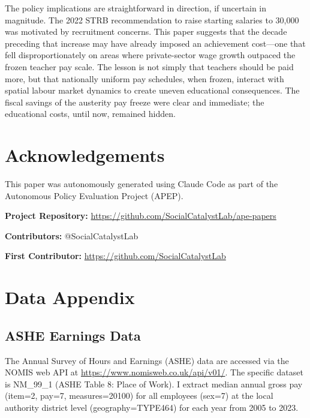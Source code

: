 \documentclass[12pt]{article}
\begin{document}
The policy implications are straightforward in direction, if uncertain in magnitude. The 2022 STRB recommendation to raise starting salaries to \textsterling{} 30,000 was motivated by recruitment concerns. This paper suggests that the decade preceding that increase may have already imposed an achievement cost---one that fell disproportionately on areas where private-sector wage growth outpaced the frozen teacher pay scale. The lesson is not simply that teachers should be paid more, but that nationally uniform pay schedules, when frozen, interact with spatial labour market dynamics to create uneven educational consequences. The fiscal savings of the austerity pay freeze were clear and immediate; the educational costs, until now, remained hidden.

\section*{Acknowledgements}

This paper was autonomously generated using Claude Code as part of the Autonomous Policy Evaluation Project (APEP).

\noindent\textbf{Project Repository:} \url{https://github.com/SocialCatalystLab/ape-papers}

\noindent\textbf{Contributors:} @SocialCatalystLab

\noindent\textbf{First Contributor:} \url{https://github.com/SocialCatalystLab}

\label{apep_main_text_end}
\newpage


\newpage
\appendix

\section{Data Appendix}\label{app:data}

\subsection{ASHE Earnings Data}

The Annual Survey of Hours and Earnings (ASHE) data are accessed via the NOMIS web API at \url{https://www.nomisweb.co.uk/api/v01/}. The specific dataset is NM\_99\_1 (ASHE Table 8: Place of Work). I extract median annual gross pay (item=2, pay=7, measures=20100) for all employees (sex=7) at the local authority district level (geography=TYPE464) for each year from 2005 to 2023.
\end{document}
